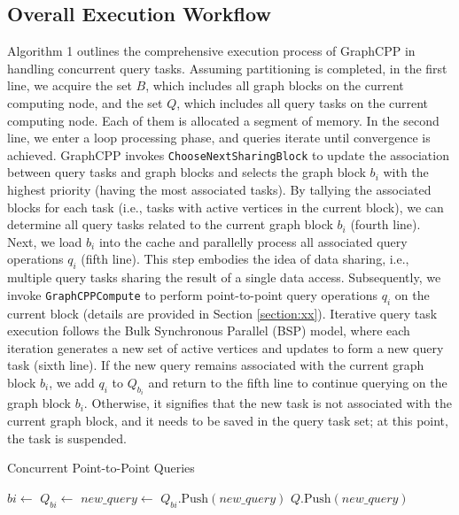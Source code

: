 \documentclass[lettersize,journal]{IEEEtran} %
\begin{document}
\subsection{Overall Execution Workflow}
Algorithm 1 outlines the comprehensive execution process of GraphCPP in handling concurrent query tasks. Assuming partitioning is completed, in the first line, we acquire the set \(B\), which includes all graph blocks on the current computing node, and the set \(Q\), which includes all query tasks on the current computing node. Each of them is allocated a segment of memory. In the second line, we enter a loop processing phase, and queries iterate until convergence is achieved. GraphCPP invokes \texttt{ChooseNextSharingBlock} to update the association between query tasks and graph blocks and selects the graph block \(b_i\) with the highest priority (having the most associated tasks). By tallying the associated blocks for each task (i.e., tasks with active vertices in the current block), we can determine all query tasks related to the current graph block \(b_i\) (fourth line). Next, we load \(b_i\) into the cache and parallelly process all associated query operations \(q_i\) (fifth line). This step embodies the idea of data sharing, i.e., multiple query tasks sharing the result of a single data access. Subsequently, we invoke \texttt{GraphCPPCompute} to perform point-to-point query operations \(q_i\) on the current block (details are provided in Section \ref{section:xx}). Iterative query task execution follows the Bulk Synchronous Parallel (BSP) model, where each iteration generates a new set of active vertices and updates to form a new query task (sixth line). If the new query remains associated with the current graph block \(b_i\), we add \(q_i\) to \(Q_{b_i}\) and return to the fifth line to continue querying on the graph block \(b_i\). Otherwise, it signifies that the new task is not associated with the current graph block, and it needs to be saved in the query task set; at this point, the task is suspended.

\begin{algorithm}
\caption{Concurrent Point-to-Point Queries}
\label{alg:concurrent_queries}
\begin{algorithmic}[1]

    \State {} 
        \State $bi \gets$ 
        \State $Q_{bi} \gets$ 
         
            \State $new\_query \gets$  
                \State $Q_{bi}.\text{Push}(new\_query)$
            \Else
                \State $Q.\text{Push}(new\_query)$
            \EndIf
        \EndFor
    \EndWhile
\EndFunction

\end{algorithmic}
\end{algorithm}
  
\end{document}
